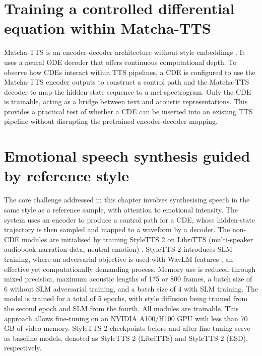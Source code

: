 \section{Training a controlled differential equation within Matcha-TTS}
Matcha-TTS is an encoder-decoder architecture without style embeddings \citep{mehta2024matcha}. It uses a neural \ac{ODE} decoder that offers continuous computational depth. To observe how \acp{CDE} interact within \ac{TTS} pipelines, a \ac{CDE} is configured to use the Matcha-TTS encoder outputs to construct a control path and the Matcha-TTS decoder to map the hidden-state sequence to a mel-spectrogram. Only the \ac{CDE} is trainable, acting as a bridge between text and acoustic representations. This provides a practical test of whether a \ac{CDE} can be inserted into an existing \ac{TTS} pipeline without disrupting the pretrained encoder-decoder mapping.


\section{Emotional speech synthesis guided by reference style}
The core challenge addressed in this chapter involves synthesising speech in the same style as a reference sample, with attention to emotional intensity. The system uses an encoder to produce a control path for a \ac{CDE}, whose hidden-state trajectory is then sampled and mapped to a waveform by a decoder. The non-CDE modules are initialised by training StyleTTS 2 on LibriTTS (multi-speaker audiobook narration data, neutral emotion) \citep{li2023styletts2}. StyleTTS 2 introduces \ac{SLM} training, where an adversarial objective is used with WavLM features \citep{chen2022wavlm}, an effective yet computationally demanding process. Memory use is reduced through mixed precision, maximum acoustic lengths of 175 or 800 frames, a batch size of 6 without \ac{SLM} adversarial training, and a batch size of 4 with \ac{SLM} training. The model is trained for a total of 5 epochs, with style diffusion being trained from the second epoch and \ac{SLM} from the fourth. All modules are trainable. This approach allows fine-tuning on an NVIDIA A100/H100 GPU with less than 70 GB of video memory. StyleTTS 2 checkpoints before and after fine-tuning serve as baseline models, denoted as StyleTTS 2 (LibriTTS) and StyleTTS 2 (\ac{ESD}), respectively.

